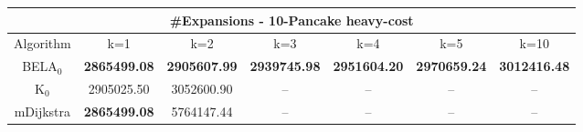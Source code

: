 \begin{tabular}{c|cccccc}\toprule
\multicolumn{7}{c}{#Expansions - 10-Pancake heavy-cost}\\ \midrule
Algorithm & k=1 & k=2 & k=3 & k=4 & k=5 & k=10 \\ \midrule
BELA$_0$ & \textbf{2865499.08} & \textbf{2905607.99} & \textbf{2939745.98} & \textbf{2951604.20} & \textbf{2970659.24} & \textbf{3012416.48} \\
K$_0$ & 2905025.50 & 3052600.90 & -- & -- & -- & -- \\
mDijkstra & \textbf{2865499.08} & 5764147.44 & -- & -- & -- & -- \\ \bottomrule 
\end{tabular}
